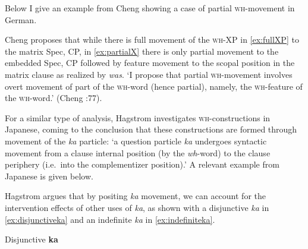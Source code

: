 \documentclass[output=paper,colorlinks,citecolor=brown,
]{langscibook}
\begin{document}
Below I give an example from Cheng \citeyearpar{Cheng:2000b} showing a case of partial \textsc{wh-}movement in German.  

\ea
{}

Cheng proposes that while there is full movement of the \textsc{wh}-XP in \ref{ex:fullXP} to the matrix Spec, CP, in \ref{ex:partialX} there is only partial movement to the embedded Spec, CP followed by feature movement to the scopal position in the matrix clause as realized by \textit{was}.  `I propose that partial \textsc{wh}-movement involves overt movement of part of the \textsc{wh}-word (hence partial), namely, the \textsc{wh}-feature of the \textsc{wh}-word.' (Cheng \citeyear{Cheng:2000b}:77).

For a similar type of analysis, Hagstrom \citeyearpar{Hagstrom:2000} investigates \textsc{wh}-constructions in Japanese, coming to the conclusion that these constructions are formed through movement of the \textit{ka} particle: `a question particle \textit{ka} undergoes syntactic movement from a clause internal position (by the  \textit{wh}-word) to the clause periphery (i.e.\ into the complementizer position).'
A relevant example from Japanese is given below.


Hagstrom argues that by positing \textit{ka} movement, we can account for the intervention effects of other uses of \textit{ka}, as shown with a disjunctive  \textit{ka} in \ref{ex:disjunctiveka} and an indefinite  \textit{ka} in \ref{ex:indefiniteka}.

\ea Disjunctive \textbf{ka} \label{ex:disjunctiveka}
\end{document}

